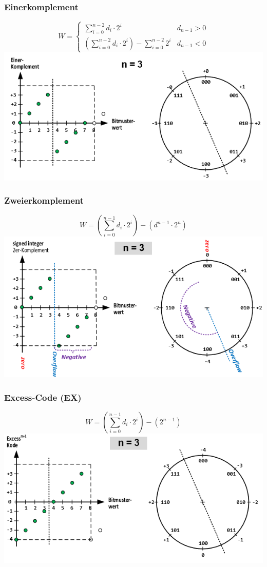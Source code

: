 \subsubsection{Einerkomplement}
\[
W =
\begin{cases}
	\sum_{i=0}^{n-2}d_i \cdot 2^i & d_{n-1} > 0 \\
	\left(\sum_{i=0}^{n-2}d_i \cdot 2^i\right) - \sum_{i=0}^{n-2}2^i & d_{n-1} < 0 
\end{cases}
\]
\includegraphics[width=\linewidth]{Images/einerkomplement}


\subsubsection{Zweierkomplement}
\[W = \left(\sum_{i=0}^{n-1}d_i\cdot 2^i\right) - (d^{n-1}\cdot2^n)\]
\includegraphics[width=\linewidth]{Images/zweierkomplement}

\subsubsection{Excess-Code (EX)}
\[W = \left(\sum_{i=0}^{n-1}d_i\cdot 2^i\right) - (2^{n-1})\]
\includegraphics[width=\linewidth]{Images/ex}


